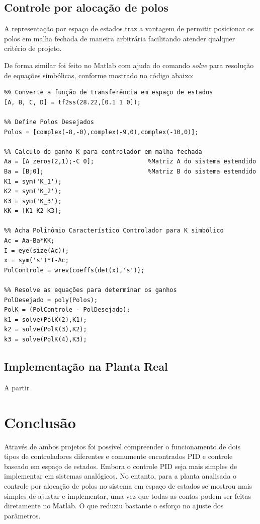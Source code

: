 \documentclass[a4paper,11pt]{article}
\begin{document}
\subsection{Controle por alocação de polos}

A representação por espaço de estados traz a vantagem de permitir posicionar os polos em malha fechada de maneira arbitrária facilitando atender qualquer critério de projeto.

De forma similar foi feito no Matlab com ajuda do comando \textit{solve} para resolução de equações simbólicas, conforme mostrado no código abaixo:

\begin{verbatim}
%% Converte a função de transferência em espaço de estados 
[A, B, C, D] = tf2ss(28.22,[0.1 1 0]);

%% Define Polos Desejados
Polos = [complex(-8,-0),complex(-9,0),complex(-10,0)];

%% Calculo do ganho K para controlador em malha fechada 
Aa = [A zeros(2,1);-C 0];               %Matriz A do sistema estendido
Ba = [B;0];                             %Matriz B do sistema estendido
K1 = sym('K_1');
K2 = sym('K_2');
K3 = sym('K_3');
KK = [K1 K2 K3];

%% Acha Polinômio Característico Controlador para K simbólico
Ac = Aa-Ba*KK;
I = eye(size(Ac));
x = sym('s')*I-Ac;
PolControle = wrev(coeffs(det(x),'s'));

%% Resolve as equações para determinar os ganhos
PolDesejado = poly(Polos);
PolK = (PolControle - PolDesejado);
k1 = solve(PolK(2),K1);
k2 = solve(PolK(3),K2);
k3 = solve(PolK(4),K3);
\end{verbatim}


\subsection{Implementação na Planta Real}

A partir

\section{Conclusão}

Através de ambos projetos foi possível compreender o funcionamento de dois tipos de controladores diferentes e comumente encontrados PID e controle baseado em espaço de estados. Embora o controle PID seja mais simples de implementar em sistemas analógicos. No entanto, para a planta analisada o controle por alocação de polos no sistema em espaço de estados se mostrou mais simples de ajustar e implementar, uma vez que todas as contas podem ser feitas diretamente no Matlab. O que reduziu bastante o esforço no ajuste dos parâmetros.
\end{document}

